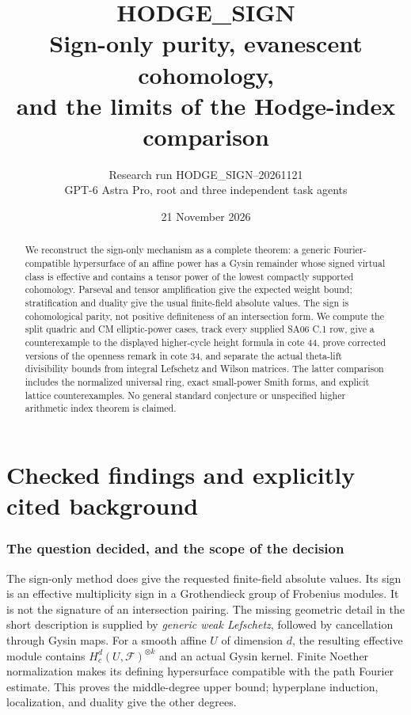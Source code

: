 \documentclass[11pt,a4paper]{article}
\title{\textbf{HODGE\_SIGN}\\[5pt]
\large Sign-only purity, evanescent cohomology,\\
and the limits of the Hodge-index comparison}
\author{Research run HODGE\_SIGN--20261121\\
\small GPT-6 Astra Pro, root and three independent task agents}
\date{21 November 2026}
\theoremstyle{remark}
\begin{document}
\maketitle
\begin{abstract}
We reconstruct the sign-only mechanism as a complete theorem: a generic
Fourier-compatible hypersurface of an affine power has a Gysin remainder
whose signed virtual class is effective and contains a tensor power of the
lowest compactly supported cohomology.  Parseval and tensor amplification
give the expected weight bound; stratification and duality give the usual
finite-field absolute values.  The sign is cohomological parity, not
positive definiteness of an intersection form.  We compute the split
quadric and CM elliptic-power cases, track every supplied SA06 C.1 row,
give a counterexample to the displayed higher-cycle height formula in
cote 44, prove corrected versions of the openness remark in cote 34, and
separate the actual theta-lift divisibility bounds from integral Lefschetz
and Wilson matrices.  The latter comparison includes the normalized
universal ring, exact small-power Smith forms, and explicit lattice
counterexamples.  No general standard conjecture or unspecified higher
arithmetic index theorem is claimed.
\end{abstract}
\tableofcontents
\newpage
\part{Checked findings and explicitly cited background}


\section{The question decided, and the scope of the decision}

The sign-only method does give the requested finite-field absolute values.
Its sign is an effective multiplicity sign in a Grothendieck group of
Frobenius modules.  It is not the signature of an intersection pairing.
The missing geometric detail in the short description is supplied by
\emph{generic weak Lefschetz}, followed by cancellation through Gysin maps.
For a smooth affine $U$ of dimension $d$, the resulting effective module
contains $H_c^d(U,\mathcal F)^{\otimes k}$ and an actual Gysin kernel.
Finite Noether normalization makes its defining hypersurface compatible
with the path Fourier estimate.  This proves the middle-degree upper bound;
hyperplane induction, localization, and duality give the other degrees.
\end{document}
